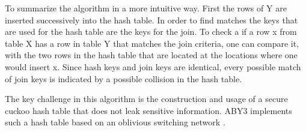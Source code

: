 To summarize the algorithm in a more intuitive way. First the rows of Y are inserted successively into the hash table. In order to find matches the keys that are used for the hash table are the keys for the join. To check a if a row x from table X has a row in table Y that matches the join criteria, one can compare it, with the two rows in the hash table that are located at the locations where one would insert x. Since hash keys and join keys are identical, every possible match of join keys is indicated by a possible collision in the hash table.

The key challenge in this algorithm is the construction and usage of a secure cuckoo hash table that does not leak sensitive information. ABY3 implements such a hash table based on an oblivious switching network \cite{aby3}. 










\



